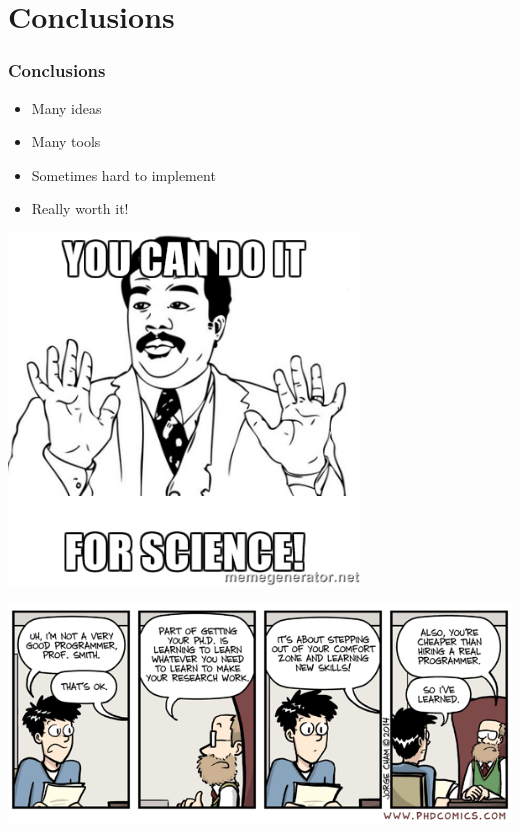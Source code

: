 \documentclass[14pt]{beamer}
\begin{document}
\section{Conclusions}
\begin{frame}
\frametitle{Conclusions}
\begin{itemize}
\item Many ideas
\item Many tools
\item Sometimes hard to implement
\item \alert{Really worth it!}
\end{itemize}
\end{frame}
\begin{frame}
\centering
\includegraphics[width=0.7\textwidth]{doit}

\end{frame}
\begin{frame}
\includegraphics[width=\textwidth]{sad_truth}
\end{frame}
\end{document}
